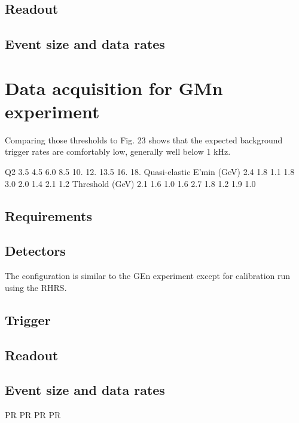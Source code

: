 \documentclass{article}
\begin{document}
\subsection{Readout}

\subsection{Event size and data rates}
\section{Data acquisition for GMn experiment}
Comparing those thresholds
to Fig. 23 shows that the expected background trigger rates are comfortably low, generally well
below 1 kHz.

Q2 3.5 4.5 6.0 8.5 10. 12. 13.5 16. 18.
Quasi-elastic E’min (GeV) 2.4 1.8 1.1 1.8 3.0 2.0 1.4 2.1 1.2
Threshold (GeV) 2.1 1.6 1.0 1.6 2.7 1.8 1.2 1.9 1.0



\subsection{Requirements}
\subsection{Detectors}
The configuration is similar to the GEn experiment except for calibration run using the RHRS.

\subsection{Trigger}

\subsection{Readout}

\subsection{Event size and data rates}

\begin{thebibliography}{9}
 PR
 PR
 PR
 PR
\end{thebibliography}
\end{document}
